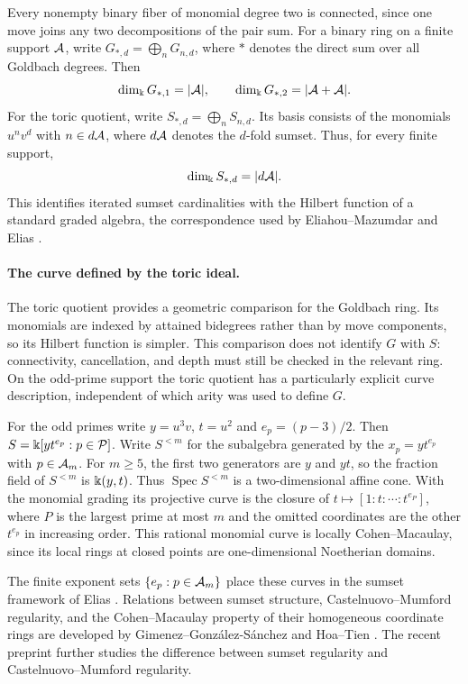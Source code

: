 Every nonempty binary fiber of monomial degree two is connected, since one
move joins any two decompositions of the pair sum. For a binary ring on a finite
support $\mathcal A$, write $G_{*,d}=\bigoplus_n G_{n,d}$, where $*$ denotes
the direct sum over all Goldbach degrees. Then
\begin{equation}\label{setup:low-hilbert}
 \dim_\Bbbk G_{*,1}=|\mathcal A|,\qquad \dim_\Bbbk G_{*,2}=|\mathcal A+\mathcal A|.
\end{equation}
For the toric quotient, write $S_{*,d}=\bigoplus_n S_{n,d}$.
Its basis consists of the monomials $u^n v^d$ with $n\in d\mathcal A$, where
$d\mathcal A$ denotes the $d$-fold sumset. Thus, for every finite support,
\[
 \dim_\Bbbk S_{*,d}=|d\mathcal A|.
\]
This identifies iterated sumset cardinalities with the Hilbert function
of a standard graded algebra, the correspondence used by
Eliahou--Mazumdar \cite{EliahouMazumdar22} and Elias \cite{Elias22}.

\paragraph{The curve defined by the toric ideal.}
The toric quotient provides a geometric comparison for the Goldbach
ring. Its monomials are indexed by attained bidegrees rather than by
move components, so its Hilbert function is simpler. This comparison
does not identify $G$ with $S$: connectivity, cancellation, and depth
must still be checked in the relevant ring. On the odd-prime support
the toric quotient has a particularly explicit curve description,
independent of which arity was used to define $G$.

For the odd primes write $y=u^3v$, $t=u^2$ and $e_p=(p-3)/2$.
Then $S=\Bbbk[yt^{e_p}:p\in\mathcal P]$. Write $S^{<m}$ for the subalgebra
generated by the $x_p=yt^{e_p}$ with $p\in\mathcal A_m$. For $m\ge5$,
the first two generators are $y$ and $yt$, so the fraction field
of $S^{<m}$ is $\Bbbk(y,t)$. Thus $\operatorname{Spec}S^{<m}$ is a
two-dimensional affine cone. With the monomial grading its projective
curve is the closure of $t\mapsto[1:t:\cdots:t^{e_P}]$, where $P$
is the largest prime at most $m$ and the omitted coordinates are the
other $t^{e_p}$ in increasing order. This rational monomial curve is
locally Cohen--Macaulay, since its local rings at closed points are
one-dimensional Noetherian domains.

The finite exponent sets $\{e_p:p\in\mathcal A_m\}$ place these curves in the
sumset framework of Elias \cite{Elias22}. Relations between sumset
structure, Castelnuovo--Mumford regularity, and the Cohen--Macaulay
property of their homogeneous coordinate rings are developed by
Gimenez--Gonz\'alez-S\'anchez \cite{GimenezGonzalez23} and
Hoa--Tien \cite{HoaTien26}. The recent preprint
\cite{ChaudharyKhandelwal26} further studies the difference between
sumset regularity and Castelnuovo--Mumford regularity.

